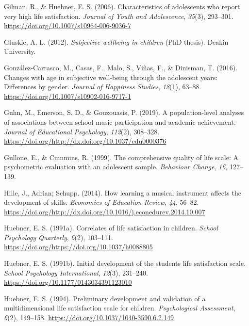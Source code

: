 \documentclass[a4, 12pt]{article}
\begin{document}
\leavevmode\hypertarget{ref-Gilman2006}{}%
Gilman, R., \& Huebner, E. S. (2006). Characteristics of adolescents who report very high life satisfaction. \emph{Journal of Youth and Adolescence}, \emph{35}(3), 293--301. \url{https://doi.org/10.1007/s10964-006-9036-7}

\leavevmode\hypertarget{ref-Gluskie2012}{}%
Gluskie, A. L. (2012). \emph{Subjective wellbeing in children} (PhD thesis). Deakin University.

\leavevmode\hypertarget{ref-GonzalezCarrasco2016}{}%
González-Carrasco, M., Casas, F., Malo, S., Viñas, F., \& Dinisman, T. (2016). Changes with age in subjective well-being through the adolescent years: Differences by gender. \emph{Journal of Happiness Studies}, \emph{18}(1), 63--88. \url{https://doi.org/10.1007/s10902-016-9717-1}

\leavevmode\hypertarget{ref-Guhn2019}{}%
Guhn, M., Emerson, S. D., \& Gouzouasis, P. (2019). A population-level analyses of associations between school music participation and academic achievement. \emph{Journal of Educational Psychology}, \emph{112}(2), 308--328. \url{https://doi.org/http://dx.doi.org/10.1037/edu0000376}

\leavevmode\hypertarget{ref-Gullone1999}{}%
Gullone, E., \& Cummins, R. (1999). The comprehensive quality of life scale: A psychometric evaluation with an adolescent sample. \emph{Behaviour Change}, \emph{16}, 127--139.

\leavevmode\hypertarget{ref-Hille2014}{}%
Hille, J., Adrian; Schupp. (2014). How learning a musical instrument affects the development of skills. \emph{Economics of Education Review}, \emph{44}, 56--82. \url{https://doi.org/http://dx.doi.org/10.1016/j.econedurev.2014.10.007}

\leavevmode\hypertarget{ref-Huebner1991}{}%
Huebner, E. S. (1991a). Correlates of life satisfaction in children. \emph{School Psychology Quarterly}, \emph{6}(2), 103--111. \url{https://doi.org/https://doi.org/10.1037/h0088805}

\leavevmode\hypertarget{ref-Huebner1991a}{}%
Huebner, E. S. (1991b). Initial development of the students life satisfaction scale. \emph{School Psychology International}, \emph{12}(3), 231--240. \url{https://doi.org/10.1177/0143034391123010}

\leavevmode\hypertarget{ref-Huebner1994}{}%
Huebner, E. S. (1994). Preliminary development and validation of a multidimensional life satisfaction scale for children. \emph{Psychological Assessment}, \emph{6}(2), 149--158. \url{https://doi.org/10.1037/1040-3590.6.2.149}
\end{document}
